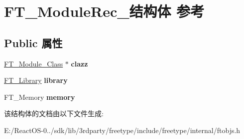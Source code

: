 \hypertarget{struct_f_t___module_rec__}{}\section{F\+T\+\_\+\+Module\+Rec\+\_\+结构体 参考}
\label{struct_f_t___module_rec__}
\subsection*{Public 属性}
\begin{DoxyCompactItemize}
\item 
\mbox{\label{struct_f_t___module_rec___ac762573dc13af2d2af190a9e855742f5}} 
\hyperlink{struct_f_t___module___class__}{F\+T\+\_\+\+Module\+\_\+\+Class} $\ast$ {\bfseries clazz}
\item 
\mbox{\label{struct_f_t___module_rec___ac3d04fbdc2988bf9a39f4ad6d3cb4b5f}} 
\hyperlink{struct_f_t___library_rec__}{F\+T\+\_\+\+Library} {\bfseries library}
\item 
\mbox{\label{struct_f_t___module_rec___a33113e9eb2d6cd8ee6666da75ff8e108}} 
F\+T\+\_\+\+Memory {\bfseries memory}
\end{DoxyCompactItemize}


该结构体的文档由以下文件生成\+:\begin{DoxyCompactItemize}
\item 
E\+:/\+React\+O\+S-\/0../sdk/lib/3rdparty/freetype/include/freetype/internal/ftobjs.\+h\end{DoxyCompactItemize}
